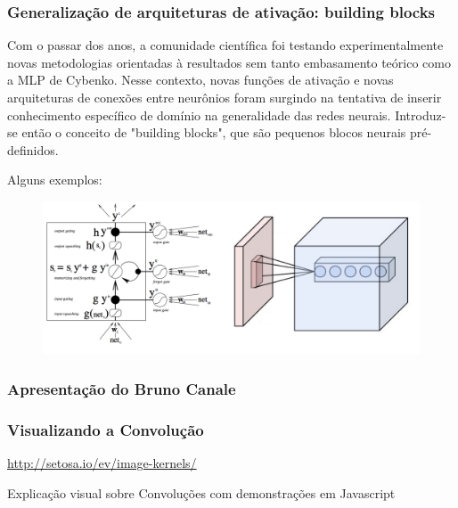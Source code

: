 \documentclass[tikz,10pt]{beamer}
\begin{document}
\begin{frame}
	\frametitle{Generalização de arquiteturas de ativação: building blocks}
	
Com o passar dos anos, a comunidade científica foi testando experimentalmente novas metodologias orientadas à     resultados sem tanto embasamento teórico como a MLP de Cybenko. Nesse contexto, novas funções de ativação e       novas arquiteturas de conexões entre neurônios foram surgindo na tentativa de inserir conhecimento específico     de domínio na generalidade das redes neurais. Introduz-se então o conceito de "building blocks", que são pequenos blocos neurais pré-definidos.

Alguns exemplos:

	 \begin{figure}
	\centering
	\includegraphics[scale=0.3]{blocks.png}
	\end{figure}
	
	
\end{frame}

\begin{frame}
	\frametitle{Apresentação do Bruno Canale}
\end{frame}


\begin{frame}
	\frametitle{Visualizando a Convolução}
	\centering
	\par \url{http://setosa.io/ev/image-kernels/}
	\par Explicação visual sobre Convoluções com demonstrações em Javascript
\end{frame}
\end{document}
